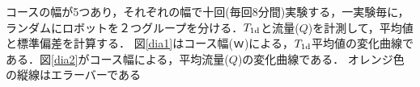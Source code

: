コースの幅が5つあり，それぞれの幅で十回(毎回8分間)実験する，一実験毎に，ランダムにロボットを２つグループを分ける．$T_{\rm 1d}$と流量($Q$)を計測して，平均値と標準偏差を計算する．
図\ref{dia1}はコース幅($ｗ$)による，$T_{\rm 1d}$平均値の変化曲線である．図\ref{dia2}がコース幅による，平均流量($Q$)の変化曲線である．
オレンジ色の縦線はエラーバーである

